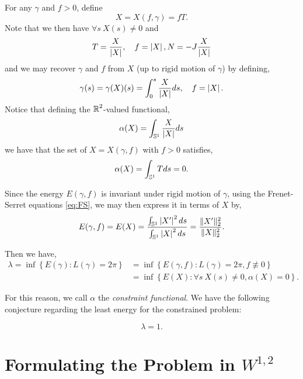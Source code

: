 \documentclass[12pt]{article}
\begin{document}
For any \(\gamma\) and \(f > 0\), define
\begin{equation}
\label{eq:X}
X = X(f, \gamma) = f T.
\end{equation}
Note that we then have \(\forall s \> X(s) \ne 0\) and
\begin{equation}
\label{eq:TNX}
T = \frac{X}{\left|{X}\right|}, \quad f = \left|{X}\right|, N = -J \frac{X}{\left|{X}\right|}
\end{equation}
and we may recover \(\gamma\) and \(f\) from \(X\) (up to rigid motion of \(\gamma\)) by defining,
\begin{equation}
\label{eq:gammaX}
\gamma(s) = \gamma (X) (s) = \int_0^s \frac{X}{\left|{X}\right|} ds, \quad f = \left|{X}\right|.
\end{equation}
Notice that defining the \(\operatorname{\mathbb{R}}^2\)-valued functional,
\begin{equation}
\label{eq:alpha}
\alpha(X) = \int_{\operatorname{\mathbb{S}^1}} \frac{X}{\left|{X}\right|} ds
\end{equation}
we have that the set of \(X = X(\gamma, f)\) with \(f > 0\) satisfies,
\[
\alpha(X) = \int_{\operatorname{\mathbb{S}^1}} T ds = 0.
\]

Since the energy \(E(\gamma, f)\) is invariant under rigid motion of \(\gamma\), using the Frenet-Serret equations \eqref{eq:FS}, we may then express it in terms of \(X\) by,
\begin{equation}
\label{eq:gammafX}
E(\gamma, f) = E(X) = \frac{\int_{\operatorname{\mathbb{S}^1}} \left|{X'}\right|^2 ds}{\int_{\operatorname{\mathbb{S}^1}} \left|{X}\right|^2 ds} = \frac{\|X'\|_2^2}{\|X\|_2^2}.
\end{equation}

Then we have,
\begin{equation}
\label{eq:infimums}
\begin{split}
\lambda = \inf\left\{E(\gamma) : L(\gamma) = 2\pi\right\} &= \inf\left\{E(\gamma, f) : L(\gamma) = 2\pi, f \not\equiv 0\right\} \\
&= \inf\left\{E(X) : \forall s \> X(s) \ne 0, \alpha(X) = 0\right\}.
\end{split}
\end{equation}

For this reason, we call \(\alpha\) the \emph{constraint functional}. We have the following conjecture regarding the least energy for the constrained problem:

\begin{conj}
\label{conj:main}
\[
\lambda = 1.
\]
\end{conj}

\section{Formulating the Problem in \(W^{1,2}\)}
\end{document}

